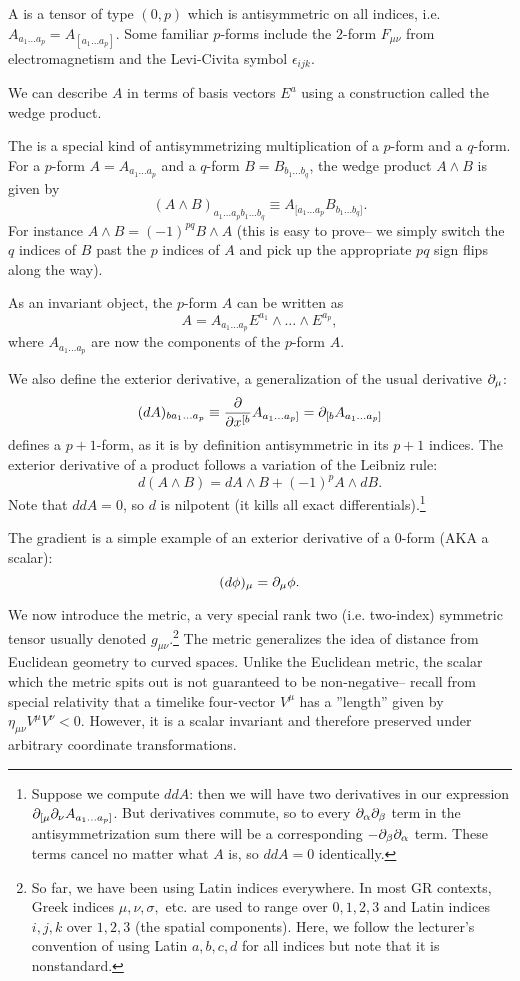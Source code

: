 \begin{defn}
A  is a tensor of type $(0,p)$ which is antisymmetric on all indices, i.e. $A_{a_1\ldots a_p}=A_{[a_1 \ldots a_p]}$. Some familiar $p$-forms include the $2$-form $F_{\mu\nu}$ from electromagnetism and the Levi-Civita symbol $\epsilon_{ijk}$.
\end{defn}
We can describe $A$ in terms of basis vectors $E^a$ using a construction called the wedge product.
\begin{defn}
The  is a special kind of antisymmetrizing multiplication of a $p$-form and a $q$-form. For a $p$-form $A=A_{a_1\ldots a_p}$ and a $q$-form $B=B_{b_1\ldots b_q}$, the wedge product $A\wedge B$ is given by
$$(A\wedge B)_{a_1\ldots a_p b_1 \ldots b_q}\equiv A_{[a_1\ldots a_p}B_{b_1\ldots b_q]}.$$
For instance $A\wedge B = (-1)^{pq}B \wedge A$ (this is easy to prove-- we simply switch the $q$ indices of $B$ past the $p$ indices of $A$ and pick up the appropriate $pq$ sign flips along the way).
\end{defn}
As an invariant object, the $p$-form $A$ can be written as $$A=A_{a_1\ldots a_p} E^{a_1}\wedge \ldots \wedge E^{a_p},$$ where $A_{a_1\ldots a_p}$ are now the components of the $p$-form $A$.

\begin{defn}
We also define the exterior derivative, a generalization of the usual derivative $\partial_\mu$:
$$(dA)_{ba_1 \ldots a_p} \equiv \frac{\partial }{\partial {x^{[b}}} A_{a_1 \ldots a_p]}=\partial_{[b}A_{a_1 \ldots a_p]}$$
defines a $p+1$-form, as it is by definition antisymmetric in its $p+1$ indices.
The exterior derivative of a product follows a variation of the Leibniz rule:
$$d(A\wedge B)=dA\wedge B +(-1)^p A\wedge dB.$$
Note that $ddA=0$, so $d$ is nilpotent (it kills all exact differentials).\footnote{Suppose we compute $ddA$: then we will have two derivatives in our expression $\partial_{[\mu} \partial_\nu A_{a_1\ldots a_p]}$. But derivatives commute, so to every $\partial_\alpha \partial_\beta$ term in the antisymmetrization sum there will be a corresponding $-\partial_\beta \partial_\alpha$ term. These terms cancel no matter what $A$ is, so $ddA=0$ identically.}
\end{defn}

The gradient is a simple example of an exterior derivative of a 0-form (AKA a scalar):
$$(d\phi)_\mu=\partial_\mu \phi.$$

We now introduce the metric, a very special rank two (i.e. two-index) symmetric tensor usually denoted $g_{\mu\nu}$.\footnote{So far, we have been using Latin indices everywhere. In most GR contexts, Greek indices $\mu,\nu,\sigma,$ etc. are used to range over $0,1,2,3$ and Latin indices $i,j,k$ over $1,2,3$ (the spatial components). Here, we follow the lecturer's convention of using Latin $a,b,c,d$ for all indices but note that it is nonstandard.} The metric generalizes the idea of distance from Euclidean geometry to curved spaces. Unlike the Euclidean metric, the scalar which the metric spits out is not guaranteed to be non-negative-- recall from special relativity that a timelike four-vector $V^\mu$ has a ''length'' given by $\eta_{\mu\nu} V^\mu V^\nu <0$. However, it is a scalar invariant and therefore preserved under arbitrary coordinate transformations.

